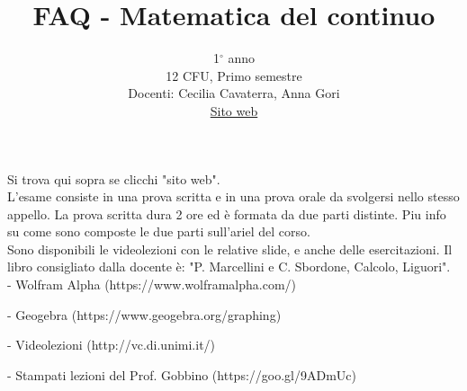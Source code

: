 \documentclass{article}
\title{FAQ - \textbf{Matematica del continuo}}
\author{
	1$^{\circ}$ anno\\12 CFU, Primo semestre\\
	Docenti: Cecilia Cavaterra, Anna Gori\\ 
	\href{https://ccavaterramc.ariel.ctu.unimi.it/v5/home/Default.aspx}{Sito web}
	\date{}
}
\begin{document}
 
	\maketitle
	
	\begin{enumerate}
		
		\rmfamily
		
		Si trova qui sopra se clicchi "sito web".\\
		
		L'esame consiste in una prova scritta e in una prova orale da svolgersi nello stesso appello. 
		La prova scritta dura 2 ore ed è formata da due parti distinte. 
		Piu info su come sono composte le due parti sull'ariel del corso.\\
		
		Sono disponibili le videolezioni con le relative slide, e anche delle esercitazioni.
		Il libro consigliato dalla docente è: "P. Marcellini e C. Sbordone, Calcolo, Liguori".\\
		
		- Wolfram Alpha (https://www.wolframalpha.com/)
		
		- Geogebra (https://www.geogebra.org/graphing)
		
		- Videolezioni (http://vc.di.unimi.it/)
		
		- Stampati lezioni del Prof. Gobbino (https://goo.gl/9ADmUc)
		
	\end{enumerate}
	
\end{document}
